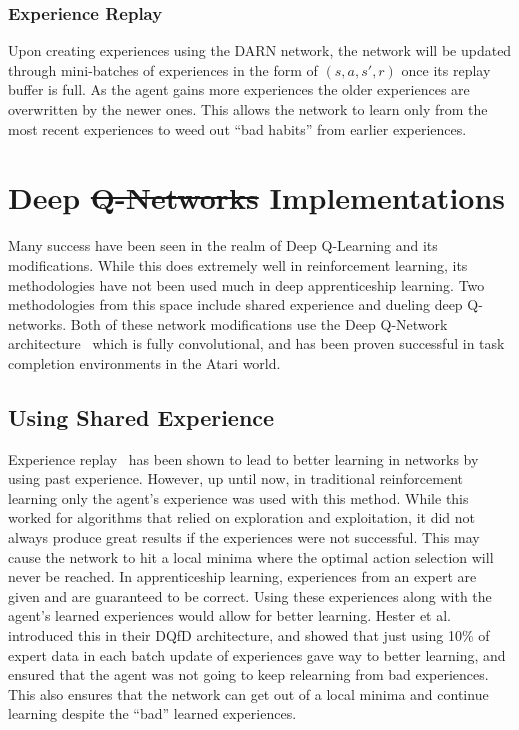 \documentclass[12pt,american]{report}
\providecommand{\DIFaddtex}[1]{{\protect\color{blue}\uwave{#1}}} %
\providecommand{\DIFdeltex}[1]{{\protect\color{red}\sout{#1}}}                      %
\providecommand{\DIFaddbegin}{} %
\providecommand{\DIFaddend}{} %
\providecommand{\DIFdelbegin}{} %
\providecommand{\DIFdelend}{} %
\providecommand{\DIFadd}[1]{\texorpdfstring{\DIFaddtex{#1}}{#1}} %
\providecommand{\DIFdel}[1]{\texorpdfstring{\DIFdeltex{#1}}{}} %
\newcommand{\DIFscaledelfig}{0.5}
\newlength{\DIFdelgraphicswidth} %
\newlength{\DIFdelgraphicsheight} %
\newcommand{\DIFaddincludegraphics}[2][]{{\color{blue}\fbox{\DIFOincludegraphics[#1]{#2}}}} %
\newcommand{\DIFdelincludegraphics}[2][]{%
\sbox{\DIFdelgraphicsbox}{\DIFOincludegraphics[#1]{#2}}%
\settoboxwidth{\DIFdelgraphicswidth}{\DIFdelgraphicsbox} %
\settoboxtotalheight{\DIFdelgraphicsheight}{\DIFdelgraphicsbox} %
\scalebox{\DIFscaledelfig}{%
\parbox[b]{\DIFdelgraphicswidth}{\usebox{\DIFdelgraphicsbox}\\[-\baselineskip] \rule{\DIFdelgraphicswidth}{0em}}\llap{\resizebox{\DIFdelgraphicswidth}{\DIFdelgraphicsheight}{%
\setlength{\unitlength}{\DIFdelgraphicswidth}%
\begin{picture}(1,1)%
\thicklines\linethickness{2pt} %
{\color[rgb]{1,0,0}\put(0,0){\framebox(1,1){}}}%
{\color[rgb]{1,0,0}\put(0,0){\line( 1,1){1}}}%
{\color[rgb]{1,0,0}\put(0,1){\line(1,-1){1}}}%
\end{picture}%
}\hspace*{3pt}}} %
} %
\DeclareRobustCommand{\DIFaddbegin}{\DIFOaddbegin \let\includegraphics\DIFaddincludegraphics} %
\DeclareRobustCommand{\DIFaddend}{\DIFOaddend \let\includegraphics\DIFOincludegraphics} %
\DeclareRobustCommand{\DIFdelbegin}{\DIFOdelbegin \let\includegraphics\DIFdelincludegraphics} %
\DeclareRobustCommand{\DIFdelend}{\DIFOaddend \let\includegraphics\DIFOincludegraphics} %
\begin{document}
\subsubsection{Experience Replay}
Upon creating experiences using the DARN network, the network will be updated through mini-batches of experiences in the form of $(s,a,s',r)$ once its replay buffer is full.  As the agent gains more experiences the older experiences are overwritten by the newer ones.  This allows the network to learn only from the most recent experiences to weed out ``bad habits'' from earlier experiences. 

\section{Deep \DIFdelbegin \DIFdel{Q-Networks }\DIFdelend \DIFaddbegin \DIFadd{Q-Network }\DIFaddend Implementations}
Many success have been seen in the realm of Deep Q-Learning and its modifications.  While this does extremely well in reinforcement learning, its methodologies have not been used much in deep apprenticeship learning.  Two methodologies from this space include shared experience and dueling deep Q-networks.  Both of these network modifications use the Deep Q-Network architecture~\cite{atari} which is fully convolutional, and has been proven successful in task completion environments in the Atari world.
\subsection{Using Shared Experience \DIFaddbegin \DIFadd{Replay}\DIFaddend }
Experience replay~\cite{atari} has been shown to lead to better learning in networks by using past experience.  However, up until now, in traditional reinforcement learning only the agent's experience was used with this method.  While this worked for algorithms that relied on exploration and exploitation, it did not always produce great results if the experiences were not successful. This may cause the network to hit a local minima where the optimal action selection will never be reached. In apprenticeship learning, experiences from an expert are given and are guaranteed to be correct.  Using these experiences along with the agent's learned experiences would allow for better learning.  Hester et al.~\cite{hester2017learning} introduced this in their DQfD architecture, and showed that just using 10\% of expert data in each batch update of experiences gave way to better learning, and ensured that the agent was not going to keep relearning from bad experiences.  This also ensures that the network can get out of a local minima and continue learning despite the ``bad'' learned experiences.
\end{document}
